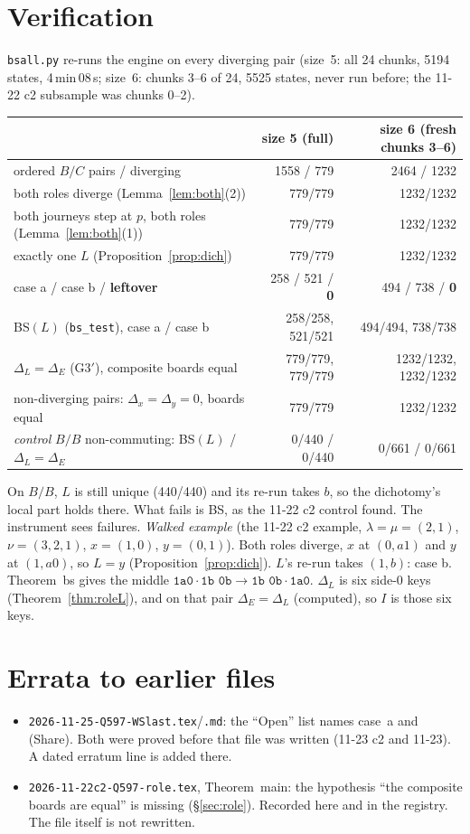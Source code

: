 \documentclass[11pt]{article}
\theoremstyle{definition}\newtheorem{definition}[theorem]{Definition}\newtheorem{remark}[theorem]{Remark}
\begin{document}
\section{Verification}\label{sec:ver}
\texttt{bsall.py} re-runs the engine on every diverging pair (size~5: all 24 chunks, 5194 states, 4\,min\,08\,s; size~6: chunks 3--6 of 24, 5525 states, never run before; the 11-22 c2 subsample was chunks 0--2).
\begin{center}\small\begin{tabular}{lrr}\toprule
& size 5 (full) & size 6 (fresh chunks 3--6)\\\midrule
ordered $B/C$ pairs / diverging & 1558 / 779 & 2464 / 1232\\
both roles diverge (Lemma~\ref{lem:both}(2)) & 779/779 & 1232/1232\\
both journeys step at $p$, both roles (Lemma~\ref{lem:both}(1)) & 779/779 & 1232/1232\\
exactly one $L$ (Proposition~\ref{prop:dich}) & 779/779 & 1232/1232\\
case a / case b / \textbf{leftover} & 258 / 521 / \textbf{0} & 494 / 738 / \textbf{0}\\
BS$(L)$ (\texttt{bs\_test}), case a / case b & 258/258, 521/521 & 494/494, 738/738\\
$\Delta_L=\Delta_E$ (G3$'$), composite boards equal & 779/779, 779/779 & 1232/1232, 1232/1232\\
non-diverging pairs: $\Delta_x=\Delta_y=0$, boards equal & 779/779 & 1232/1232\\
\emph{control} $B/B$ non-commuting: BS$(L)$ / $\Delta_L=\Delta_E$ & 0/440 / 0/440 & 0/661 / 0/661\\\bottomrule
\end{tabular}\end{center}
On $B/B$, $L$ is still unique (440/440) and its re-run takes $b$, so the dichotomy's local part holds there. What fails is BS, as the 11-22 c2 control found. The instrument sees failures.
\emph{Walked example} (the 11-22 c2 example, $\lambda=\mu=(2,1)$, $\nu=(3,2,1)$, $x=(1,0)$, $y=(0,1)$). Both roles diverge, $x$ at $(0,a1)$ and $y$ at $(1,a0)$, so $L=y$ (Proposition~\ref{prop:dich}). $L$'s re-run takes $(1,b)$: case b. Theorem~bs gives the middle $\texttt{1a0}\cdot\texttt{1b 0b}\to\texttt{1b 0b}\cdot\texttt{1a0}$. $\Delta_L$ is six side-0 keys (Theorem~\ref{thm:roleL}), and on that pair $\Delta_E=\Delta_L$ (computed), so $I$ is those six keys.

\section{Errata to earlier files}
\begin{itemize}
\item \texttt{2026-11-25-Q597-WSlast.tex}/\texttt{.md}: the ``Open'' list names case~a and (Share). Both were proved before that file was written (11-23 c2 and 11-23). A dated erratum line is added there.
\item \texttt{2026-11-22c2-Q597-role.tex}, Theorem~main: the hypothesis ``the composite boards are equal'' is missing (\S\ref{sec:role}). Recorded here and in the registry. The file itself is not rewritten.
\end{itemize}
\end{document}
